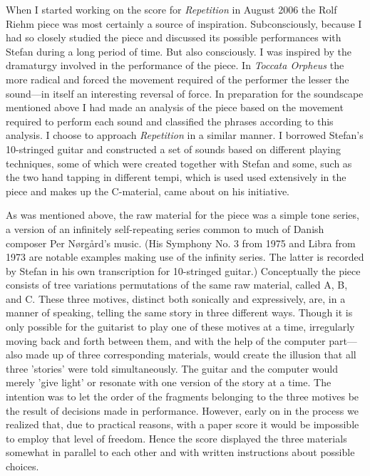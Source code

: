When I started working on the score for \emph{Repetition} in August
2006 the Rolf Riehm piece was most certainly a source of
inspiration. Subconsciously, because I had so closely studied the piece
and discussed its possible performances with Stefan during a long
period of time. But also consciously. I was inspired by the dramaturgy
involved in the performance of the piece. In \emph{Toccata Orpheus}
the more radical and forced the movement required of the performer the
lesser the sound---in itself an interesting reversal of force. In
preparation for the soundscape mentioned above I had made an analysis
of the piece based on the movement required to perform each sound and
classified the phrases according to this analysis. I choose
to approach \emph{Repetition} in a similar manner. I borrowed Stefan's
10-stringed guitar and constructed a set of sounds based on different
playing techniques, some of which were created together with Stefan and some, such as the
two hand tapping in different tempi, which is used used extensively in
the piece and makes up the C-material, came about on his initiative.

As was mentioned above, the raw material for the piece was a simple
tone series, a version of an infinitely self-repeating series common
to much of Danish composer Per N{\o}rg{\aa}rd's music. (His Symphony
No. 3 from 1975 and Libra from 1973 are notable examples making use of
the infinity series.  The latter is recorded by Stefan in his own
transcription for 10-stringed guitar.) Conceptually the piece consists
of tree variations permutations of the same raw material, called A, B,
and C. These three motives, distinct both sonically and expressively,
are, in a manner of speaking, telling the same story in three
different ways. Though it is only possible for the guitarist to play
one of these motives at a time, irregularly moving back and forth
between them, and with the help of the computer part---also made up of
three corresponding materials, would create the illusion that all
three 'stories' were told simultaneously. The guitar and the computer
would merely 'give light' or resonate with one version of the story at
a time. The intention was to let the order of the fragments belonging
to the three motives be the result of decisions made in
performance. However, early on in the process we realized that, due to
practical reasons, with a paper score it would be impossible to employ
that level of freedom. Hence the score displayed the three materials
somewhat in parallel to each other and with written instructions about
possible choices.

